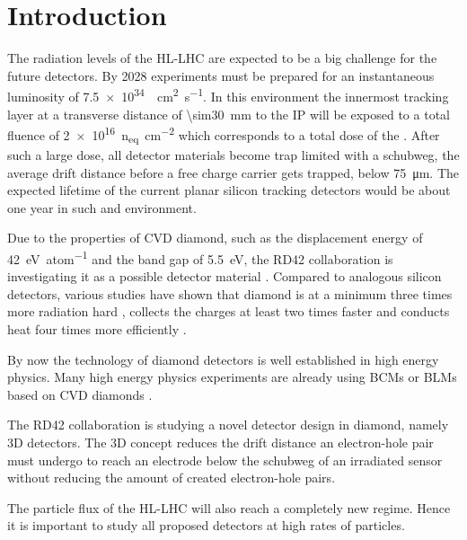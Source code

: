 \section{Introduction}
The radiation levels of the \ac{HL-LHC} are expected to be a big challenge for the future detectors. By 2028 experiments must be prepared for an instantaneous luminosity of \SI{7.5e34}{\per\centi\meter\squared\per\second}. In this environment the innermost tracking layer at a transverse distance of \SI{\sim30}{\milli\meter} to the \acl{IP} will be exposed to a total fluence of \SI{2e16}{n_{eq}\per\centi\meter^2} which corresponds to a total dose of the  \cite{dose}. After such a large dose, all detector materials become trap limited with a schubweg, the average drift distance before a free charge carrier gets trapped, below \SI{75}{\micro\meter}.  The expected lifetime of the current planar silicon tracking detectors would be about one year in such and environment.\par
Due to the properties of \ac{CVD} diamond, such as the displacement energy of \SI{42}{\electronvolt\per atom} and the band gap of \SI{5.5}{\electronvolt}, the RD42 collaboration is investigating it as a possible detector material \cite{rd42}. Compared to analogous silicon detectors,  various studies have shown that diamond is at a minimum three times more radiation hard \cite{deboer}, collects the charges at least two times faster \cite{pernegger} and conducts heat four times more efficiently \cite{zhao}.\par
By now the technology of diamond detectors is well established in high energy physics. Many high energy physics experiments are already using \aclp{BCM} or \aclp{BLM} based on \ac{CVD} diamonds \cite{babar, bcm, dbm1}.\par
The RD42 collaboration is studying a novel detector design in diamond, namely 3D detectors. The 3D concept reduces the drift distance an electron-hole pair must undergo to reach an electrode below the schubweg of an irradiated sensor without reducing the amount of created electron-hole pairs.\par
The particle flux of the \ac{HL-LHC} will also reach a completely new regime. Hence it is important to study all proposed detectors at high rates of particles.
